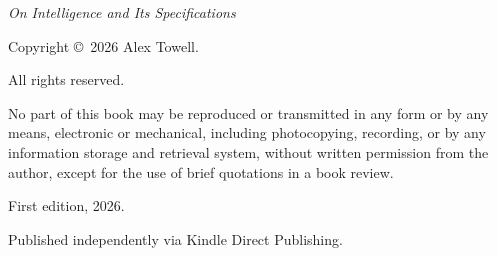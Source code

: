 \thispagestyle{empty}

\begin{center}
\textit{On Intelligence and Its Specifications}

\medskip

Copyright \copyright\ 2026 Alex Towell.

All rights reserved.

\medskip

No part of this book may be reproduced or transmitted in any form or by any means, electronic or mechanical, including photocopying, recording, or by any information storage and retrieval system, without written permission from the author, except for the use of brief quotations in a book review.

\medskip

First edition, 2026.

\medskip

Published independently via Kindle Direct Publishing.

\end{center}

